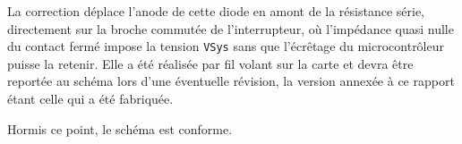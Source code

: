 La correction déplace l'anode de cette diode en amont de la résistance série, directement sur la broche commutée de l'interrupteur, où l'impédance quasi nulle du contact fermé impose la tension \texttt{VSys} sans que l'écrêtage du microcontrôleur puisse la retenir. Elle a été réalisée par fil volant sur la carte et devra être reportée au schéma lors d'une éventuelle révision, la version annexée à ce rapport étant celle qui a été fabriquée.

Hormis ce point, le schéma est conforme.